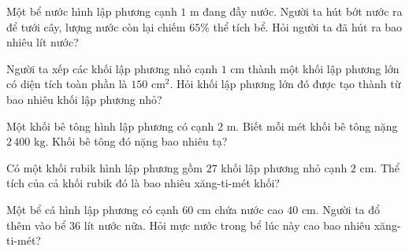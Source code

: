 \begin{ex} %
Một bể nước hình lập phương cạnh $1\text{ m}$ đang đầy nước. Người ta hút bớt nước ra để tưới cây, lượng nước còn lại chiếm $65\%$ thể tích bể. Hỏi người ta đã hút ra bao nhiêu lít nước?
\end{ex}

\begin{ex} %
Người ta xếp các khối lập phương nhỏ cạnh $1\text{ cm}$ thành một khối lập phương lớn có diện tích toàn phần là $150\text{ cm}^2$. Hỏi khối lập phương lớn đó được tạo thành từ bao nhiêu khối lập phương nhỏ?
\end{ex}

\begin{ex} %
Một khối bê tông hình lập phương có cạnh $2\text{ m}$. Biết mỗi mét khối bê tông nặng $2\,400\text{ kg}$. Khối bê tông đó nặng bao nhiêu tạ?
\end{ex}

\begin{ex} %
Có một khối rubik hình lập phương gồm $27$ khối lập phương nhỏ cạnh $2\text{ cm}$. Thể tích của cả khối rubik đó là bao nhiêu xăng-ti-mét khối?
\end{ex}

\begin{ex} %
Một bể cá hình lập phương có cạnh $60\text{ cm}$ chứa nước cao $40\text{ cm}$. Người ta đổ thêm vào bể $36\text{ lít}$ nước nữa. Hỏi mực nước trong bể lúc này cao bao nhiêu xăng-ti-mét?
\end{ex}
